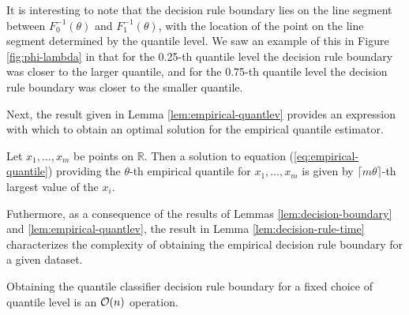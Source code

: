 It is interesting to note that the decision rule boundary lies on the line
segment between $F_0^{-1}(\theta)$ and $F_1^{-1}(\theta)$, with the location of
the point on the line segment determined by the quantile level.  We saw an
example of this in Figure \ref{fig:phi-lambda} in that for the 0.25-th quantile
level the decision rule boundary was closer to the larger quantile, and for the
0.75-th quantile level the decision rule boundary was closer to the smaller
quantile.

Next, the result given in Lemma \ref{lem:empirical-quantlev} provides an
expression with which to obtain an optimal solution for the empirical quantile
estimator.  

\begin{lemma}
  \label{lem:empirical-quantlev}
  Let $x_1, \dots, x_m$ be points on $\mathbb{R}$.  Then a solution to equation
  (\ref{eq:empirical-quantile}) providing the $\theta$-th empirical quantile for
  $x_1, \dots, x_m$ is given by $\lceil m \theta \rceil$-th largest value of the
  $x_i$.
\end{lemma}


Futhermore, as a consequence of the results of Lemmas
\ref{lem:decision-boundary} and \ref{lem:empirical-quantlev}, the result in
Lemma \ref{lem:decision-rule-time} characterizes the complexity of obtaining the
empirical decision rule boundary for a given dataset.

\begin{lemma}
  \label{lem:decision-rule-time}
  Obtaining the quantile classifier decision rule boundary for a fixed choice of
  quantile level is an $\mathcal{O}(n)$ operation.
\end{lemma}





